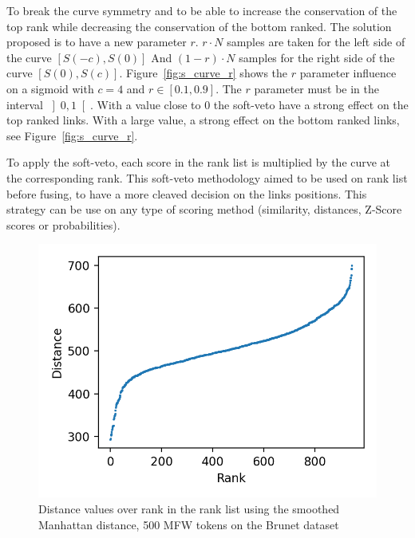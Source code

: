 To break the curve symmetry and to be able to increase the conservation of the top rank while decreasing the conservation of the bottom ranked.
The solution proposed is to have a new parameter $r$.
$r \cdot N$ samples are taken for the left side of the curve $\left[S(-c), S(0)\right]$
And $(1-r) \cdot N$ samples for the right side of the curve $\left[S(0), S(c)\right]$.
Figure~\ref{fig:s_curve_r} shows the $r$ parameter influence on a sigmoid with $c = 4$ and $r \in \left[0.1, 0.9\right]$.
The $r$ parameter must be in the interval $\left]0, 1\right[$.
With a value close to $0$ the soft-veto have a strong effect on the top ranked links.
With a large value, a strong effect on the bottom ranked links, see Figure~\ref{fig:s_curve_r}.

To apply the soft-veto, each score in the rank list is multiplied by the curve at the corresponding rank.
This soft-veto methodology aimed to be used on rank list before fusing, to have a more cleaved decision on the links positions.
This strategy can be use on any type of scoring method (similarity, distances, Z-Score scores or probabilities).

\begin{figure}
  \centering
  \caption{Distance values over rank in the rank list using the smoothed Manhattan distance, 500 MFW tokens on the Brunet dataset}
  \label{fig:distance_over_rank}
  \includegraphics[width=\linewidth]{img/distance_over_rank.png}
\end{figure}

